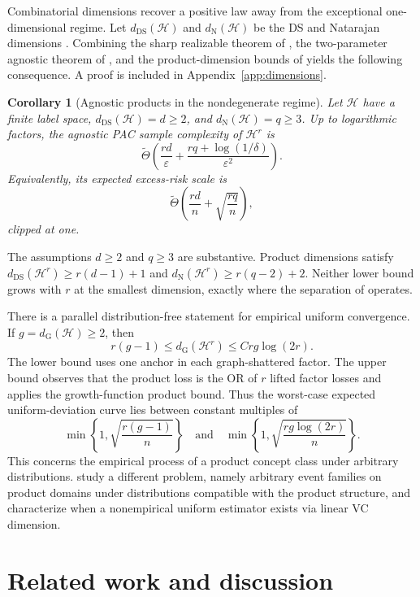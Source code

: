 \documentclass{article}
\newtheorem{corollary}[theorem]{Corollary}
\theoremstyle{definition}
\theoremstyle{remark}
\newcommand{\cH}{\mathcal H}
\newcommand{\Nat}{d_{\mathrm N}}
\newcommand{\DS}{d_{\mathrm{DS}}}
\newcommand{\Gdim}{d_{\mathrm G}}
\newcommand{\1}{\mathbf 1}
\begin{document}
Combinatorial dimensions recover a positive law away from the exceptional one-dimensional regime. Let \(\DS(\cH)\) and \(\Nat(\cH)\) be the DS and Natarajan dimensions \citep{natarajan1989learning}. Combining the sharp realizable theorem of \citet{pabbaraju2026optimal}, the two-parameter agnostic theorem of \citet{cohen2025natarajan}, and the product-dimension bounds of \citet{hanneke2024direct} yields the following consequence. A proof is included in Appendix~\ref{app:dimensions}.

\begin{corollary}[Agnostic products in the nondegenerate regime]
\label{cor:agnostic}
Let \(\cH\) have a finite label space, \(\DS(\cH)=d\ge2\), and \(\Nat(\cH)=q\ge3\). Up to logarithmic factors, the agnostic PAC sample complexity of \(\cH^r\) is \[ \widetilde\Theta\left( \frac{rd}{\varepsilon} +\frac{rq+\log(1/\delta)}{\varepsilon^2} \right). \] Equivalently, its expected excess-risk scale is \[ \widetilde\Theta\left(\frac{rd}{n}+\sqrt{\frac{rq}{n}}\right), \] clipped at one.
\end{corollary}

The assumptions \(d\ge2\) and \(q\ge3\) are substantive. Product dimensions satisfy \(\DS(\cH^r)\ge r(d-1)+1\) and \(\Nat(\cH^r)\ge r(q-2)+2\). Neither lower bound grows with \(r\) at the smallest dimension, exactly where the separation of \citet{more2026separation} operates.

There is a parallel distribution-free statement for empirical uniform convergence. If \(g=\Gdim(\cH)\ge2\), then \[ r(g-1)\le\Gdim(\cH^r)\le C rg\log(2r). \] The lower bound uses one anchor in each graph-shattered factor. The upper bound observes that the product loss is the OR of \(r\) lifted factor losses and applies the growth-function product bound. Thus the worst-case expected uniform-deviation curve lies between constant multiples of \[ \min\left\{1,\sqrt{\frac{r(g-1)}{n}}\right\} \quad\text{and}\quad \min\left\{1,\sqrt{\frac{rg\log(2r)}{n}}\right\}. \] This concerns the empirical process of a product concept class under arbitrary distributions. \citet{holzman2026uniform} study a different problem, namely arbitrary event families on product domains under distributions compatible with the product structure, and characterize when a nonempirical uniform estimator exists via linear VC dimension.

\section{Related work and discussion}
\label{sec:related}
\end{document}
